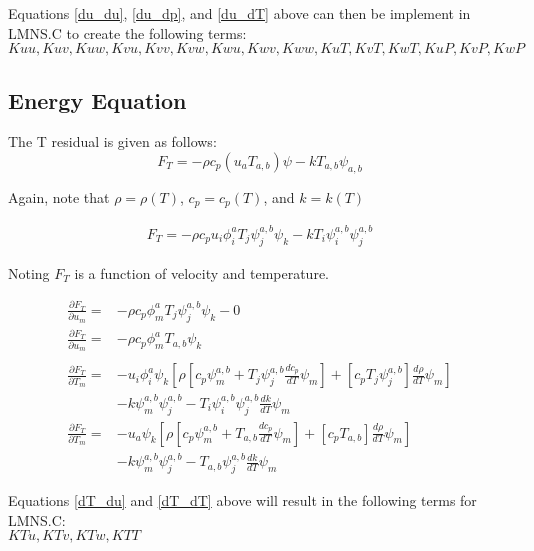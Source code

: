 Equations \ref{du_du}, \ref{du_dp}, and \ref{du_dT} above can then be implement in LMNS.C to create the following terms:\\
$Kuu, Kuv, Kuw, Kvu, Kvv, Kvw, Kwu, Kwv, Kww, KuT, KvT, KwT, KuP, KvP, KwP$

\newpage
\subsection{Energy Equation}
The T residual is given as follows:
\begin{equation}
    F_T = -\rho c_p (u_a T_{a,b})\psi - k T_{a,b} \psi_{a,b}
\end{equation}

Again, note that $\rho = \rho(T)$, $c_p = c_p(T)$, and $k = k(T)$

\begin{align}
    F_T = -\rho c_p u_i \phi_i^a T_j \psi_j^{a,b} \psi_k - k T_i \psi_i^{a,b} \psi_j^{a,b}
\end{align}

Noting $F_T$ is a function of velocity and temperature.

\begin{align}
    \frac{\partial F_T}{\partial u_m} = &-\rho c_p \phi_m^a T_j \psi_j^{a,b} \psi_k - 0 \nonumber \\
    \frac{\partial F_T}{\partial u_m} = &-\rho c_p \phi_m^a T_{a,b} \psi_k \label{dT_du} \\
    \nonumber \\
    \frac{\partial F_T}{\partial T_m} = &-u_i \phi_i^a \psi_k \left [ \rho [ c_p \psi_m^{a,b} + T_j \psi_j^{a,b} \frac{d c_p}{dT} \psi_m ] + [ c_p T_j \psi_j^{a,b} ] \frac{d \rho}{dT} \psi_m  \right ] \nonumber \\
                                      &- k \psi_m^{a,b} \psi_j^{a,b} - T_i \psi_i^{a,b} \psi_j^{a,b} \frac{dk}{dT} \psi_m \nonumber \\
    \frac{\partial F_T}{\partial T_m} = &-u_a \psi_k \left [ \rho [ c_p \psi_m^{a,b} + T_{a,b} \frac{d c_p}{dT} \psi_m ] + [ c_p T_{a,b} ] \frac{d \rho}{dT} \psi_m  \right ] \nonumber \\
                                      &- k \psi_m^{a,b} \psi_j^{a,b} - T_{a,b} \psi_j^{a,b} \frac{dk}{dT} \psi_m \label{dT_dT}
\end{align}

Equations \ref{dT_du} and \ref{dT_dT} above will result in the following terms for LMNS.C:\\
$KTu, KTv, KTw, KTT$


